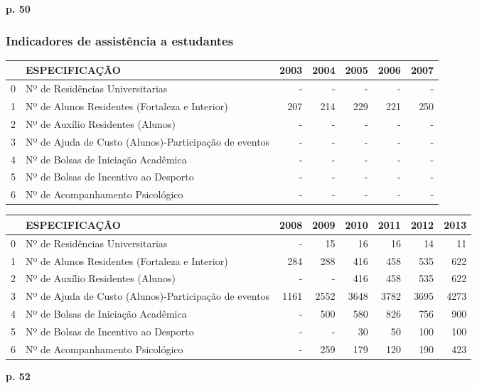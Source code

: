 \documentclass{article}
\begin{document}
\textbf{p. 50}

\subsubsection{Indicadores de assistência a estudantes}
\begin{tabular}{llrrrrr}
\toprule
{} &                                          ESPECIFICAÇÃO &  2003 &  2004 &  2005 &  2006 &  2007 \\
\midrule
0 &  Nº de Residências Universitarias & - & - & - & - & - \\
1 &  Nº de Alunos Residentes (Fortaleza e Interior) &  207 &  214 &  229 &  221 &  250 \\
2 &  Nº de Auxílio Residentes (Alunos) & - & - & - & - & - \\
3 &  Nº de Ajuda de Custo (Alunos)-Participação de eventos & - & - & - & - & - \\
4 &  Nº de Bolsas de Iniciação Acadêmica & - & - & - & - & - \\
5 &  Nº de Bolsas de Incentivo ao Desporto & - & - & - & - & - \\
6 &  Nº de Acompanhamento Psicológico & - & - & - & - & - \\
\bottomrule
\end{tabular}
\begin{tabular}{llrrrrrr}
\toprule
{} &                                          ESPECIFICAÇÃO &  2008 &  2009 &  2010 &  2011 &  2012 &  2013 \\
\midrule
0 &  Nº de Residências Universitarias & - &  15 &  16 &  16 &  14 &  11 \\
1 &  Nº de Alunos Residentes (Fortaleza e Interior) &  284 &  288 &  416 &  458 &  535 &  622 \\
2 &  Nº de Auxílio Residentes (Alunos) & - & - &  416 &  458 &  535 &  622 \\
3 &  Nº de Ajuda de Custo (Alunos)-Participação de eventos &  1161 &  2552 &  3648 &  3782 &  3695 &  4273 \\
4 &  Nº de Bolsas de Iniciação Acadêmica & - &  500 &  580 &  826 &  756 &  900 \\
5 &  Nº de Bolsas de Incentivo ao Desporto & - & - &  30 &  50 &  100 &  100 \\
6 &  Nº de Acompanhamento Psicológico & - &  259 &  179 &  120 &  190 &  423 \\
\bottomrule
\end{tabular}

\textbf{p. 52}
\end{document}
